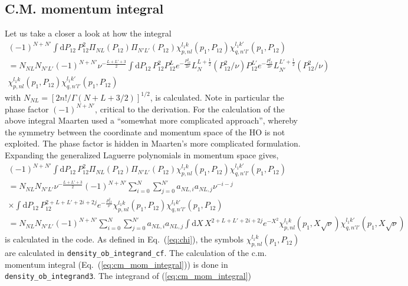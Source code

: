 \documentclass[10pt]{article}
\begin{document}
\subsection{C.M. momentum integral}
\label{ssec:cm_mom_integral}
Let us take a closer a look at how the integral
\begin{multline}
(-1)^{N+N'}\int \text{d} P_{12} \, P_{12}^{2} \Pi_{N L}(P_{12}) \Pi_{N' 
L'}(P_{12}) \chi_{p,nl}^{l_1 k}(p_1,P_{12}) \chi_{q,n'l'}^{l_1 
k'}(p_1,P_{12}) \\
= N_{NL} N_{N'L'} (-1)^{N+N'} \nu^{ - \frac{L+L'+3}{2}} \int \text{d} P_{12} \, 
P_{12}^{2} 
P_{12}^{L} e^{- \frac{P_{12}^{2}}{2 \nu}} L_{N}^{L+\frac{1}{2}}( 
P_{12}^{2}/\nu) 
P_{12}^{L'} e^{- \frac{P_{12}^{2}}{2 \nu}} L_{N'}^{L'+\frac{1}{2}}( 
P_{12}^{2}/\nu)  \\
\chi_{p,nl}^{l_1 k}(p_1,P_{12}) \chi_{q,n'l'}^{l_1 k'}(p_1,P_{12}) \,
\end{multline}
with $N_{NL} = [ 2n! / \Gamma( N + L + 3/2) ]^{1/2}$, is calculated.
Note in particular the phase factor $(-1)^{N+N'}$, critical to the derivation.
For the calculation of the above integral Maarten used a ``somewhat more 
complicated approach'', whereby the symmetry between the coordinate and 
momentum space of the HO is not exploited.
The phase factor is hidden in Maarten's more complicated formulation.
Expanding the generalized Laguerre polynomials in momentum space gives,
\begin{multline}
(-1)^{N+N'} \int \text{d} P_{12} \, P_{12}^{2} \Pi_{N L}(P_{12}) \Pi_{N' 
L'}(P_{12}) \chi_{p,nl}^{l_1 k}(p_1,P_{12}) \chi_{q,n'l'}^{l_1 
k'}(p_1,P_{12}) \\
= N_{NL} N_{N'L'} \nu^{ - \frac{L+L'+3}{2}} (-1)^{N+N'}
\sum_{i=0}^{N} \sum_{j=0}^{N'} a_{NL,i} a_{NL,j} \nu^{-i-j} \\
 \times\int \text{d} P_{12} \, P_{12}^{2+L+L'+2i+2j}  e^{- \frac{P_{12}^{2}}{ 
\nu}}  
\chi_{p,nl}^{l_1 k}(p_1,P_{12}) \chi_{q,n'l'}^{l_1 k'}(p_1,P_{12})\\
=N_{NL} N_{N'L'} (-1)^{N+N'}
\sum_{i=0}^{N} \sum_{j=0}^{N'} a_{NL,i} a_{NL,j}
 \int \text{d} X \, X^{2+L+L'+2i+2j}  e^{- X^2}  
\chi_{p,nl}^{l_1 k}(p_1,X\sqrt{\nu}) \chi_{q,n'l'}^{l_1 k'}(p_1,X\sqrt{\nu})
\label{eq:cm_mom_integral}
\end{multline}
is calculated in the code. As defined in Eq.~(\ref{eq:chi}), the symbols 
$\chi_{p,nl}^{l_1 k}(p_1,P_{12})$ are calculated in 
\texttt{density\_ob\_integrand\_cf}. The calculation of the c.m. momentum 
integral (Eq.~(\ref{eq:cm_mom_integral})) is done in 
\texttt{density\_ob\_integrand3}. The integrand of (\ref{eq:cm_mom_integral}) 
\end{document}
